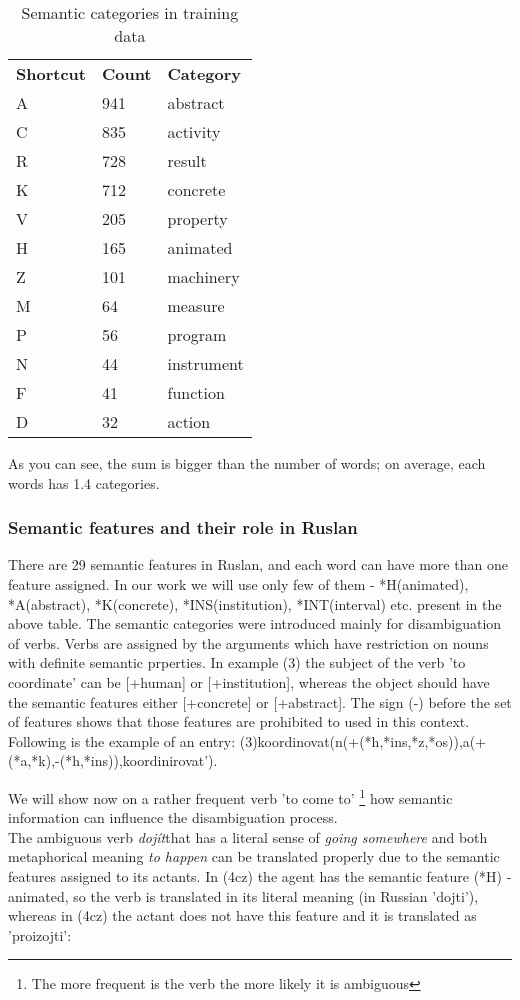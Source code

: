 \documentclass[letterpaper]{article}
\begin{document}
\begin{table}
\begin{tabular}{|l|l|l|}
 \hline
\textbf{Shortcut} &  \textbf{Count} & \textbf{Category}\\
A & 941 & abstract \\ \hline
C & 835 & activity \\ \hline
R & 728 & result \\ \hline
K & 712 & concrete \\ \hline
V & 205 & property \\ \hline
H & 165 & animated \\ \hline
Z & 101 & machinery \\ \hline
M & 64 & measure\\ \hline
P & 56 & program \\ \hline
N & 44 & instrument \\ \hline
F & 41 & function \\ \hline
D & 32 & action \\ \hline

\end{tabular}
\caption{Semantic categories in training data}
\end{table}


As you can see, the sum is bigger than the number of words; on average, each words has 1.4 categories.


\subsubsection{Semantic features and their role in Ruslan}
There are 29 semantic features in Ruslan, and each word can have more than one
feature assigned. In our work we will use only few of them - *H(animated), *A(abstract),
*K(concrete), *INS(institution), *INT(interval) etc. present in the above table.
The semantic categories were introduced mainly for disambiguation of verbs.
Verbs are assigned by the arguments which have restriction on nouns with definite semantic prperties. In example (3)
the subject of the verb 'to coordinate' can be [+human] or [+institution], whereas
the object should have the semantic features either [+concrete] or [+abstract]. The sign (-)
before the set of features shows that those features are prohibited to used in this context.
Following is the example of an entry:
(3)koordinovat(n(+(*h,*ins,*z,*os)),a(+(*a,*k),-(*h,*ins)),koordinirovat').

We will show now on a rather frequent verb 'to come to' \footnote{The more frequent is the verb the more likely it is ambiguous} 
how semantic information can influence the disambiguation process.\\
The ambiguous verb \textit{dojít}that has a literal sense of \textit{going somewhere}
and both metaphorical meaning \textit{to happen} can be translated properly
due to the semantic features assigned to its actants. In (4cz) the
agent has the semantic feature (*H) - animated, so the verb is translated
in its literal meaning (in Russian 'dojti'), whereas in (4cz) the actant does not have this feature
and it is translated as 'proizojti':
\end{document}
